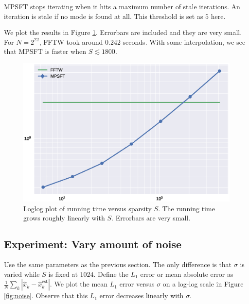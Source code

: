 \documentclass[10pt]{article}
\begin{document}
MPSFT stops iterating when it hits a maximum number of stale iterations. An iteration is stale if no mode is found at all. This threshold is set as $5$ here.

We plot the results in Figure \ref{fig:runtime}. Errorbars are included and they are very small. For $N=2^{22}$, FFTW took around $0.242$ seconds. With some interpolation, we see that MPSFT is faster when $S\lesssim 1800$.


\begin{figure}
\centering
\includegraphics[scale=0.6]{./graph/runtime}
\caption{Loglog plot of running time versus sparsity $S$. The running time grows roughly linearly with $S$. Errorbars are very small. \label{fig:runtime}}
\end{figure}


\subsection{Experiment: Vary amount of noise}

Use the same parameters as the previous section. The only difference is that $\sigma$ is varied while $S$ is fixed at $1024$. Define the $L_1$ error or mean absolute error as $\frac{1}{N}\sum_k |\hat{x}_k - \hat{x}^{\text{est}}_k|$. We plot the mean $L_1$ error versus $\sigma$ on a log-log scale in Figure \ref{fig:noise}. Observe that this $L_1$ error decreases linearly with $\sigma$.
\end{document}
